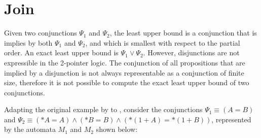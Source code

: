 
\section{Join}

Given two conjunctions $\Psi_1$ and $\Psi_2$, the least upper bound is a conjunction that is implies by both $\Psi_1$ and $\Psi_2$,
and which is smallest with respect to the partial order.
An exact least upper bound is $\Psi_1 \lor \Psi_2$.
However, disjunctions are not expressible in the 2-pointer logic.
The conjunction of all propositions that are implied by a disjunction is not always representable as a conjunction of finite size\cite{join,2pointer},
therefore it is not possible to compute the exact least upper bound of two conjunctions.

\begin{example}\label{example:infinite-join}
    Adapting the original example by \textcite{join} to \cpo, consider the conjunctions $\Psi_1 \equiv (A = B)$ and $\Psi_2 \equiv (*A = A)\land (*B=B) \land (*(1 + A) = *(1 + B))$, represented by the automata $M_1$ and $M_2$ shown below:
    \begin{center}
        \begin{minipage}{0.3\textwidth}
            \centering
        \end{minipage}
        \begin{minipage}{0.65\textwidth}
            \centering
\end{minipage}
\end{center}
\end{example}
